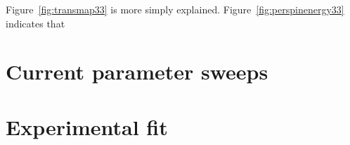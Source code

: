 Figure~\ref{fig:transmap33} is more simply explained. Figure~\ref{fig:perspinenergy33} indicates that 


\section{Current parameter sweeps}
\label{sec:twositeparamsweep}
\section{Experimental fit}
\label{sec:perrin}
\clearpage
{}